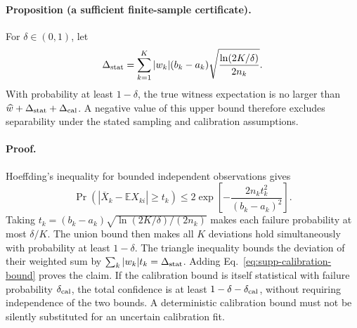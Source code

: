 \documentclass[pdflatex,sn-mathphys-num]{sn-jnl}
\begin{document}
\paragraph{Proposition (a sufficient finite-sample certificate).}
For $\delta\in(0,1)$, let
\begin{equation}
\Delta_{\rm stat}=\sum_{k=1}^K |w_k|(b_k-a_k)
\sqrt{\frac{\ln(2K/\delta)}{2n_k}}.
\label{eq:supp-witness-stat-error}
\end{equation}
With probability at least $1-\delta$, the true witness expectation is no larger than $\widehat w+\Delta_{\rm stat}+\Delta_{\rm cal}$. A negative value of this upper bound therefore excludes separability under the stated sampling and calibration assumptions.

\paragraph{Proof.}
Hoeffding's inequality for bounded independent observations gives \cite{Hoeffding1963}
\begin{equation}
\Pr\!\left(|\overline X_k-\mathbb E X_{ki}|\geq t_k\right)
\leq2\exp\!\left[-\frac{2n_kt_k^2}{(b_k-a_k)^2}\right].
\end{equation}
Taking $t_k=(b_k-a_k)\sqrt{\ln(2K/\delta)/(2n_k)}$ makes each failure probability at most $\delta/K$. The union bound then makes all $K$ deviations hold simultaneously with probability at least $1-\delta$. The triangle inequality bounds the deviation of their weighted sum by $\sum_k|w_k|t_k=\Delta_{\rm stat}$. Adding Eq.~\eqref{eq:supp-calibration-bound} proves the claim. If the calibration bound is itself statistical with failure probability $\delta_{\rm cal}$, the total confidence is at least $1-\delta-\delta_{\rm cal}$, without requiring independence of the two bounds. A deterministic calibration bound must not be silently substituted for an uncertain calibration fit.
\end{document}
